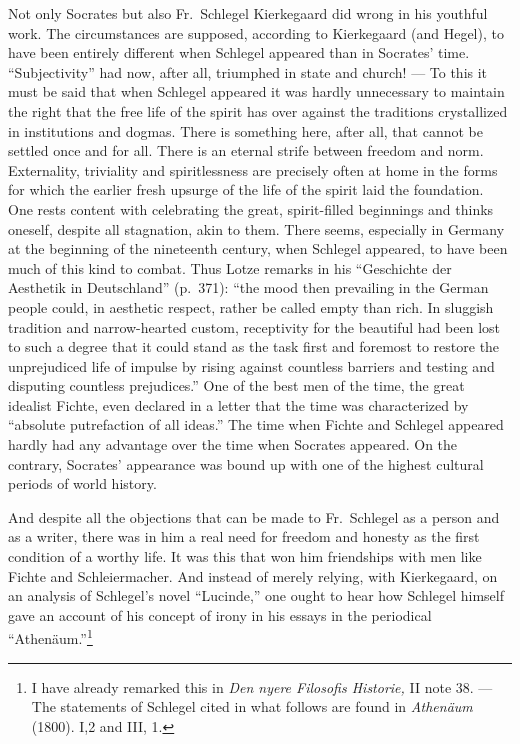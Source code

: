 \documentclass[12pt]{book}
\newcommand{\opage}[1]{\marginnote{\footnotesize\textit{[#1]}}}
\begin{document}
Not only Socrates but also Fr.~Schlegel Kierkegaard did wrong in his youthful work.
The circumstances are supposed, according to Kierkegaard (and Hegel), to have been
entirely different when Schlegel appeared than in Socrates' time. ``Subjectivity''
had now, after all, triumphed in state and church! --- To this it must be said that
when Schlegel appeared it was hardly unnecessary to maintain the right that the free
life of the spirit has over against the traditions crystallized in institutions and
dogmas. There is something here, after all, that cannot be settled once and for all.
There is an eternal strife between freedom and norm. Externality, triviality and
spiritlessness are precisely often at home in the forms for which the earlier fresh
upsurge of the life of the spirit laid the foundation. One rests content with
celebrating the great, spirit-filled beginnings and thinks oneself, despite all
stagnation, akin to them. There seems, especially in Germany at the beginning of the
nineteenth century, when Schlegel appeared, to have been much of this kind to
combat. Thus Lotze remarks in his ``Geschichte der Aesthetik in Deutschland''
(p.~371): ``the mood then prevailing in the German people could, in aesthetic
respect, rather be called empty than rich. In sluggish tradition and narrow-hearted
custom, receptivity for the beautiful had been lost to such a degree that it could
stand as the task first and foremost to restore the unprejudiced life of impulse by
rising against countless barriers and testing and disputing countless prejudices.''
One of the best men of the time, the great idealist Fichte, even declared in a
letter that the time was characterized by ``absolute putrefaction of all ideas.''
The time when Fichte and Schlegel appeared hardly had any advantage over the time
when Socrates appeared. On the contrary, Socrates' appearance was bound up with one
of the highest cultural periods of world history.

And despite all the objections that can be made to Fr.~Schlegel as a person and as a
writer, there was in him a real need for freedom and honesty as the first condition
of a worthy life. It was this that won him friendships with men like Fichte and
Schleiermacher. And instead of merely relying, with Kierkegaard, on an analysis of
Schlegel's novel ``Lucinde,'' one ought to \opage{66}hear how Schlegel himself gave
an account of his concept of irony in his essays in the periodical
``Athenäum.''\footnote{I have already remarked this in \textit{Den nyere
Filosofis Historie,} II note 38. --- The statements of Schlegel cited in what follows
are found in \textit{Athenäum} (1800). I,2 and III, 1.}
\end{document}

